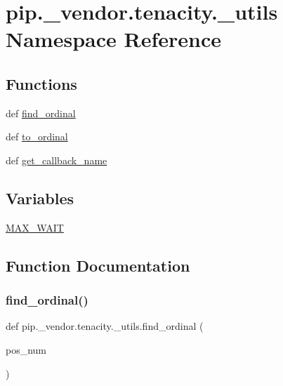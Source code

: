 \hypertarget{namespacepip_1_1__vendor_1_1tenacity_1_1__utils}{}\section{pip.\+\_\+vendor.\+tenacity.\+\_\+utils Namespace Reference}
\label{namespacepip_1_1__vendor_1_1tenacity_1_1__utils}
\subsection*{Functions}
\begin{DoxyCompactItemize}
\item 
def \hyperlink{namespacepip_1_1__vendor_1_1tenacity_1_1__utils_a09511253942209ea7a46ef47a2733041}{find\+\_\+ordinal}
\item 
def \hyperlink{namespacepip_1_1__vendor_1_1tenacity_1_1__utils_ab42f4ae14d779232a146a566a2c6679d}{to\+\_\+ordinal}
\item 
def \hyperlink{namespacepip_1_1__vendor_1_1tenacity_1_1__utils_aaa8dfc26f1fedd3a524329604054efc8}{get\+\_\+callback\+\_\+name}
\end{DoxyCompactItemize}
\subsection*{Variables}
\begin{DoxyCompactItemize}
\item 
\hyperlink{namespacepip_1_1__vendor_1_1tenacity_1_1__utils_a9d375a9541c9f9978890b401293e4fad}{M\+A\+X\+\_\+\+W\+A\+IT}
\end{DoxyCompactItemize}


\subsection{Function Documentation}
\mbox{\label{namespacepip_1_1__vendor_1_1tenacity_1_1__utils_a09511253942209ea7a46ef47a2733041}} 
\subsubsection{\texorpdfstring{find\+\_\+ordinal()}{find\_ordinal()}}
{\footnotesize\ttfamily def pip.\+\_\+vendor.\+tenacity.\+\_\+utils.\+find\+\_\+ordinal (\begin{DoxyParamCaption}\item[{}]{pos\+\_\+num }\end{DoxyParamCaption})}

